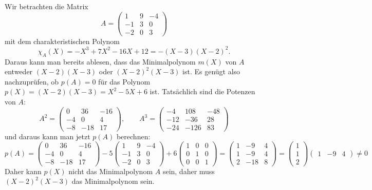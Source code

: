 \begin{beispiel}
Wir betrachten die Matrix
\[
A
=
\begin{pmatrix}
   1&  9& -4\\
  -1&  3&  0\\
  -2&  0&  3
\end{pmatrix}
\]
mit dem charakteristischen Polynom
\[
\chi_A(X)
=
-X^3+7X^2-16 X+12
=
-(X-3)(X-2)^2.
\]
Daraus kann man bereits ablesen, dass das Minimalpolynom $m(X)$ von $A$ 
entweder $(X-2)(X-3)$ oder $(X-2)^2(X-3)$ ist.
Es genügt also nachzuprüfen, ob $p(A)=0$ für das Polynom
$p(X)=(X-2)(X-3) = X^2-5X+6$ ist.
Tatsächlich sind die Potenzen von $A$:
\begin{equation}
A^2=
\begin{pmatrix}
  0&  36& -16 \\
 -4&   0&   4 \\
 -8& -18&  17 
\end{pmatrix}
,\qquad
A^3=
\begin{pmatrix}
 -4& 108& -48\\
-12& -36&  28\\
-24&-126&  83
\end{pmatrix}
\label{buch:eigenwerte:eqn:A2A3}
\end{equation}
und daraus kann man jetzt $p(A)$ berechnen:
\begin{equation}
p(A)
=
\begin{pmatrix}
  0&  36& -16 \\
 -4&   0&   4 \\
 -8& -18&  17 
\end{pmatrix}
-5
\begin{pmatrix}
   1&  9& -4\\
  -1&  3&  0\\
  -2&  0&  3
\end{pmatrix}
+
6
\begin{pmatrix}
1&0&0\\
0&1&0\\
0&0&1
\end{pmatrix}
=
\begin{pmatrix}
   1& -9&  4\\
   1& -9&  4\\
   2&-18&  8
\end{pmatrix}
=
\begin{pmatrix}1\\1\\2\end{pmatrix}
\begin{pmatrix}1&-9&4\end{pmatrix}
\ne 0
\label{buch:eigenwerte:eqn:nichtminimalpolynom}
\end{equation}
Daher kann $p(X)$ nicht das Minimalpolynom $A$
sein, daher muss $(X-2)^2(X-3)$ das Minimalpolynom sein.


\end{beispiel}
